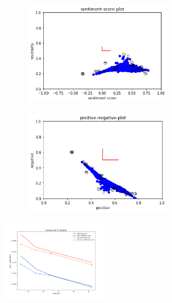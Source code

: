 \documentclass{article}
\begin{document}
\begin{figure}[h!]

\begin{subfigure}[c]{\textwidth}
\begin{subfigure}[c]{0.5\textwidth}

\includegraphics[width=0.9\textwidth]{images/tfidf_plot_01.png}


\end{subfigure}
\begin{subfigure}[c]{0.5\textwidth}

\includegraphics[width=0.9\textwidth]{images/tfidf_plot_02.png}
\end{subfigure}
\end{subfigure}
\begin{subfigure}[c]{\textwidth}
\centering
\includegraphics[width=0.5\textwidth]{images/train_valid_error.png}


\end{subfigure}
\end{figure}
\end{document}
